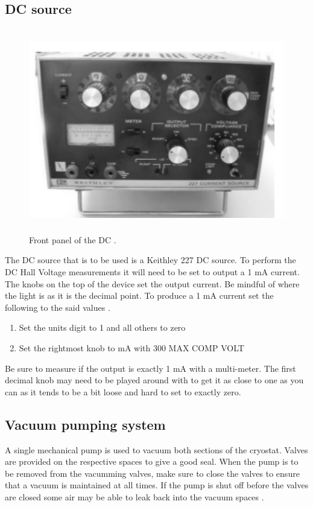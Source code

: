 \documentclass[twocolumn]{article}
\begin{document}
\subsection{DC source}
\begin{figure}
\begin{minipage}{\textwidth}
\includegraphics[width=\textwidth,height=3.5in]{DC-sourc.png}
\caption{Front panel of the DC \cite{ref:3}.}
\label{fig:8}
\end{minipage}
\end{figure}
The DC source that is to be used is a Keithley 227 DC source. To perform the DC 
Hall Voltage measurements it will need to be set to output a 1 mA current. The 
knobs on the top of the device set the output current. Be mindful of where the 
light is as it is the decimal point. To produce a 1 mA current set the 
following to the said values \cite{ref:3}.
\begin{enumerate}[label=\alph*]
\item Set the units digit to 1 and all others to zero
\item Set the rightmost knob to mA with 300 MAX COMP VOLT
\end{enumerate}
Be sure to measure if the output is exactly 1 mA with a multi-meter. The first 
decimal knob may need to be played around with to get it as close to one as you 
can as it tends to be a bit loose and hard to set to exactly zero.
\subsection{Vacuum pumping system}
A single mechanical pump is used to vacuum both sections of the cryostat. 
Valves are provided on the respective spaces to give a good seal. When the pump 
is to be removed from the vacumming valves, make sure to close the valves to 
ensure that a vacuum is maintained at all times. If the pump is shut off 
before the valves are closed some air may be able to leak back into the 
vacuum spaces \cite{ref:3}.
\end{document}
